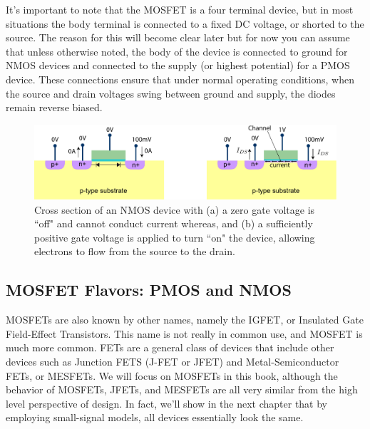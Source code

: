 It's important to note that the MOSFET is a four terminal device, but in most situations the body terminal is connected to a fixed DC voltage, or shorted to the source.  The reason for this will become clear later but for now you can assume that unless otherwise noted, the body of the device is connected to ground for NMOS devices and connected to the supply (or highest potential) for a PMOS device.  These connections ensure that under normal operating conditions, when the source and drain voltages swing between ground and supply, the diodes remain reverse biased.




\begin{figure}[tb]
\begin{center}
\includegraphics[width=\columnwidth]{mostfetxsect_current} 
\end{center}
\caption{Cross section of an NMOS device with (a) a zero gate voltage is ``off" and cannot conduct current whereas, and (b) a sufficiently positive gate voltage is applied to turn ``on" the device, allowing electrons to flow from the source to the drain. } \label{fig:mos_current}
\end{figure}

 

\subsection{MOSFET Flavors:  PMOS and NMOS}


MOSFETs are also known by other names, namely the IGFET, or Insulated Gate Field-Effect Transistors.  This name is not really in common use, and MOSFET is much more common.  FETs are a general class of devices that include other devices such as Junction FETS (J-FET or JFET) and Metal-Semiconductor FETs, or MESFETs.  We will focus on MOSFETs in this book, although the behavior of MOSFETs, JFETs, and MESFETs are all very similar from the high level perspective of design.  In fact, we'll show in the next chapter that by employing small-signal models, all devices essentially look the same.

